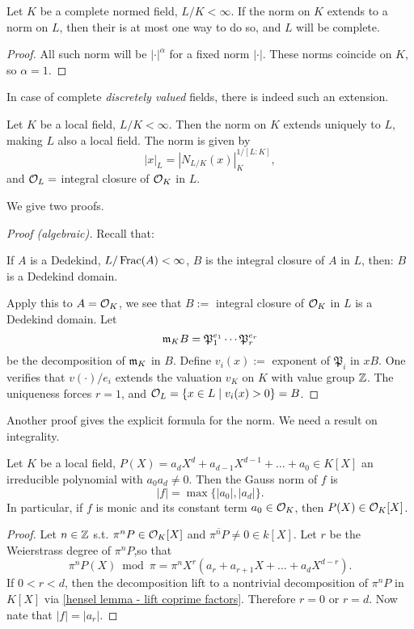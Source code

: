 \begin{corollary}
    Let $K$ be a complete normed field, $L/K < \infty$. If the norm on $K$ extends to a norm on $L$, then their is at most one way to do so, and $L$ will be complete.
\end{corollary}
\begin{proof}
    All such norm will be $|\cdot|^\alpha$ for a fixed norm $|\cdot|$.
    These norms coincide on $K$, so $\alpha = 1$.
\end{proof}

In case of complete \textit{discretely valued} fields, there is indeed such an extension.
\begin{theorem}\label{unique extension of norm for fintie extension local field}
    Let $K$ be a local field, $L/K < \infty$.
    Then the norm on $K$ extends uniquely to $L$, making $L$ also a local field.
    The norm is given by \[|x|_L = \left|N_{L/K}(x)\right|_K^{1/[L : K]},\]
    and $\mathcal{O}_L = $ integral closure of $\mathcal{O}_K$ in $L$. 
\end{theorem}
We give two proofs.
\begin{proof}
    [Proof (algebraic)]Recall that:
\begin{lemma}\label{extension of Dedekind: integral closure of Dedekind domain in finite extension of its fraction field is Dedekind domain}
    If $A$ is a Dedekind, $L/\operatorname{Frac}(A) < \infty$, $B$ is the integral closure of $A$ in $L$, then: $B$ is a Dedekind domain.
\end{lemma}
Apply this to $A = \mathcal{O}_K$,
we see that $B :=$ integral closure of $\mathcal{O}_K$ in $L$ is a Dedekind domain.
Let \[\mathfrak{m}_KB = \mathfrak{P}_1^{e_1}\cdots\mathfrak{P}_r^{e_r}\] be the decomposition of $\mathfrak{m}_K$ in $B$. Define $v_i(x) := $ exponent of $\mathfrak{P}_i$ in $xB$.
One verifies that $v(\cdot)/e_i$ extends the valuation $v_K$ on $K$ with value group $\mathbb{Z}$.
The uniqueness forces $r = 1$, and $\mathcal{O}_L = \{x\in L\mid v_i(x) > 0\} = B$.
\end{proof}
Another proof gives the explicit formula for the norm. We need a result on integrality.
\begin{proposition}
    Let $K$ be a local field, $P(X) = a_dX^d + a_{d-1}X^{d-1} + \dots + a_0\in K[X]$ an irreducible polynomial with $a_0a_d\ne 0$.
    Then the Gauss norm of $f$ is
    \[|f| = \max\{|a_0|, |a_d|\}.\]
    In particular, if $f$ is monic and its constant term $a_0\in\mathcal{O}_K$, then $P(X)\in\mathcal{O}_K[X]$.
\end{proposition}
\begin{proof}\label{monic polynomial integral iff const coeff}
    Let $n\in\mathbb{Z}$ s.t. $\pi^nP\in \mathcal{O}_K[X]$ and $\overline{\pi^nP}\ne 0\in k[X] $.
    Let $r$ be the Weierstrass degree of $\pi^nP$,so that \[\pi^nP(X)\bmod\pi = \pi^nX^r(a_r + a_{r+1}X + \dots + a_dX^{d-r}).\] 
    If $0 < r < d$,
    then the decomposition lift to a nontrivial decomposition of $\pi^nP$ in $K[X]$ via \cref{hensel lemma - lift coprime factors}.
    Therefore $r = 0$ or $r = d$.
    Now nate that $|f| = |a_r|$.
\end{proof}
